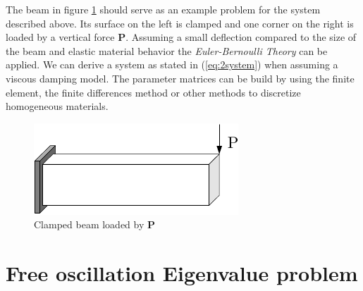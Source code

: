 \documentclass[conference]{journal}
\newcommand{\B}[1]{\mathbf{#1}}
\begin{document}
	The beam in figure \ref{fig:beam} should serve as an example problem for the system described above. Its surface on the left is clamped and one corner on the right is loaded by a vertical force $\B{P}$. Assuming a small deflection compared to the size of the beam and elastic material behavior the \textit{Euler-Bernoulli Theory} can be applied. We can derive a system as stated in (\ref{eq:2system}) when assuming a viscous damping model. The parameter matrices can be build by using the finite element, the finite differences method or other methods to discretize homogeneous materials.

	\begin{figure}[h]
	\centering
	\includegraphics{./figures/beam.pdf}
	\caption{Clamped beam loaded by $\B{P}$}
	\label{fig:beam}
	\end{figure}
	
	\section{Free oscillation Eigenvalue problem}

\end{document}
